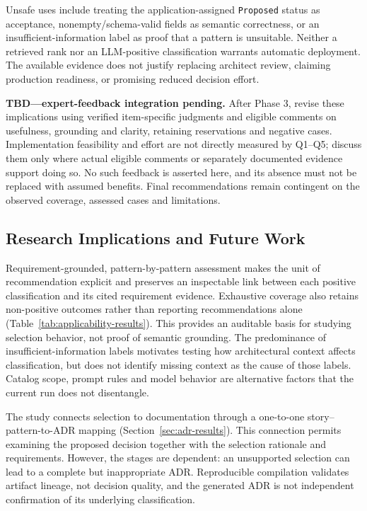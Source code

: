 Unsafe uses include treating the application-assigned \texttt{Proposed}
status as acceptance, nonempty/schema-valid fields as semantic correctness,
or an insufficient-information label as proof that a pattern is unsuitable.
Neither a retrieved rank nor an LLM-positive classification warrants
automatic deployment. The available evidence does not justify replacing
architect review, claiming production readiness, or promising reduced
decision effort.

\noindent\textbf{TBD---expert-feedback integration pending.}
After Phase 3, revise these implications using verified item-specific
judgments and eligible comments on usefulness, grounding and clarity,
retaining reservations and negative cases. Implementation feasibility and
effort are not directly measured by Q1--Q5; discuss them only where actual
eligible comments or separately documented evidence support doing so.
No such feedback is asserted here, and its absence must not be replaced
with assumed benefits. Final recommendations remain contingent on the
observed coverage, assessed cases and limitations.

\subsection{Research Implications and Future Work}
\label{sec:research-implications}

Requirement-grounded, pattern-by-pattern assessment makes the unit of
recommendation explicit and preserves an inspectable link between each
positive classification and its cited requirement evidence.
Exhaustive coverage also retains non-positive outcomes rather than
reporting recommendations alone (Table~\ref{tab:applicability-results}).
This provides an auditable basis for studying selection behavior, not
proof of semantic grounding. The predominance of insufficient-information
labels motivates testing how architectural context affects classification,
but does not identify missing context as the cause of those labels.
Catalog scope, prompt rules and model behavior are alternative factors
that the current run does not disentangle.

The study connects selection to documentation through a one-to-one
story--pattern-to-ADR mapping (Section~\ref{sec:adr-results}).
This connection permits examining the proposed decision together with
the selection rationale and requirements. However, the stages are
dependent: an unsupported selection can lead to a complete but
inappropriate ADR. Reproducible compilation validates artifact lineage,
not decision quality, and the generated ADR is not independent
confirmation of its underlying classification.

